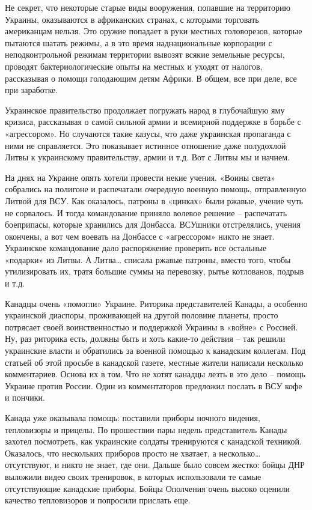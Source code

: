 Не секрет, что некоторые старые виды вооружения, попавшие на территорию
Украины, оказываются в африканских странах, с которыми торговать американцам
нельзя. Это оружие попадает в руки местных головорезов, которые пытаются шатать
режимы, а в это время наднациональные корпорации с неподконтрольной режимам
территории вывозят всякие земельные ресурсы, проводят бактериологические опыты
на местных и уходят от налогов, рассказывая о помощи голодающим детям Африки. В
общем, все при деле, все при заработке.

Украинское правительство продолжает погружать народ в глубочайшую яму кризиса,
рассказывая о самой сильной армии и всемирной поддержке в борьбе с
«агрессором». Но случаются такие казусы, что даже украинская пропаганда с ними
не справляется. Это показывает истинное отношение даже полудохлой Литвы к
украинскому правительству, армии и т.д. Вот с Литвы мы и начнем.

На днях на Украине опять хотели провести некие учения. «Воины света» собрались
на полигоне и распечатали очередную военную помощь, отправленную Литвой для
ВСУ. Как оказалось, патроны в «цинках» были ржавые, учение чуть не сорвалось. И
тогда командование приняло волевое решение – распечатать боеприпасы, которые
хранились для Донбасса. ВСУшники отстрелялись, учения окончены, а вот чем
воевать на Донбассе с «агрессором» никто не знает. Украинское командование дало
распоряжение проверить все остальные «подарки» из Литвы. А Литва… списала
ржавые патроны, вместо того, чтобы утилизировать их, тратя большие суммы на
перевозку, рытье котлованов, подрыв и т.д.

Канадцы очень «помогли» Украине. Риторика представителей Канады, а особенно
украинской диаспоры, проживающей на другой половине планеты, просто потрясает
своей воинственностью и поддержкой Украины в «войне» с Россией. Ну, раз
риторика есть, должны быть и хоть какие-то действия – так решили украинские
власти и обратились за военной помощью к канадским коллегам. Под статьей об
этой просьбе в канадской газете, местные жители написали несколько
комментариев. Основа их в том. Что не хотят канадцы лезть в это дело – помощь
Украине против России. Один из комментаторов предложил послать в ВСУ кофе и
пончики.

Канада уже оказывала помощь: поставили приборы ночного видения, тепловизоры и
прицелы. По прошествии пары недель представитель Канады захотел посмотреть, как
украинские солдаты тренируются с канадской техникой. Оказалось, что нескольких
приборов просто не хватает, а несколько… отсутствуют, и никто не знает, где
они. Дальше было совсем жестко: бойцы ДНР выложили видео своих тренировок, в
которых использовали те самые отсутствующие канадские приборы. Бойцы Ополчения
очень высоко оценили качество тепловизоров и попросили прислать еще.

